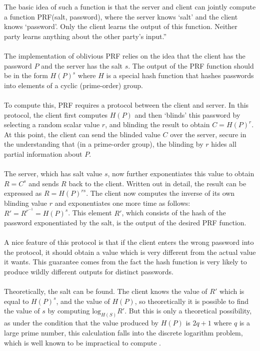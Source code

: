 \documentclass[11pt]{article}
\let\oldcite=\cite
\renewcommand\cite[1]{\ifthenelse{\equal{#1}{NEEDED}}{[citation~needed]}{\oldcite{#1}}}
\begin{document}
The basic idea of such a function is that the server and client can jointly compute a function PRF(salt, password), where the server knows `salt' and the client knows `password'. Only the client learns the output of this function. Neither party learns anything about the other party’s input.''\\\\
The implementation of oblivious PRF relies on the idea that the client has the password $P$ and the server has the salt $s$.
The output of the PRF function should be in the form $H(P)^s$ where $H$ is a special hash function that hashes passwords into elements of a cyclic (prime-order) group.\\\\
To compute this, PRF requires a protocol between the client and server. In this protocol, the client first computes $H(P)$ and then `blinds' this password by selecting a random scalar value $r$, and blinding the result to obtain $C=H(P)^r$. At this point, the client can send the blinded value $C$ over the server, secure in the understanding that (in a prime-order group), the blinding by $r$ hides all partial information about $P$.\\\\
The server, which has salt value $s$, now further exponentiates this value to obtain $R=C^s$ and sends $R$ back to the client. Written out in detail, the result can be expressed as $R=H(P)^{rs}$. The client now computes the inverse of its own blinding value $r$ and exponentiates one more time as follows: $R'=R^{r^{-1}}=H(P)^s$. This element $R'$, which consists of the hash of the password exponentiated by the salt, is the output of the desired PRF function.\\\\
A nice feature of this protocol is that if the client enters the wrong password into the protocol, it should obtain a value which is very different from the actual value it wants. This guarantee comes from the fact the hash function is very likely to produce wildly different outputs for distinct passwords.\\\\
Theoretically, the salt can be found. The client knows the value of $R'$ which is equal to $H(P)^s$, and the value of $H(P)$, so theoretically it is possible to find the value of $s$ by computing $\mathrm{log}_{H(S)}R'$. But this is only a theoretical possibility, as under the condition that the value produced by $H(P)$ is $2q+1$ where $q$ is a large prime number, this calculation falls into the discrete logarithm problem, which is well known to be impractical to compute \cite{dong2016math}. 
\end{document}

